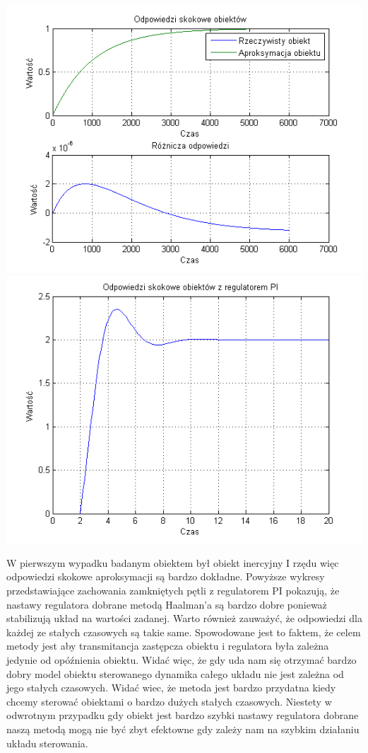 \documentclass[10pt,a4paper]{article}
\begin{document}
\begin{center}
\includegraphics[scale=1]{images/jeden/skrypt_41.png}\\
\includegraphics[scale=1]{images/jeden/skrypt_42.png}\\
\end{center}
\newpage

W pierwszym wypadku badanym obiektem był obiekt inercyjny I rzędu więc odpowiedzi skokowe aproksymacji są bardzo dokładne. Powyższe wykresy przedstawiające zachowania zamkniętych pętli z regulatorem PI pokazują, że nastawy regulatora dobrane metodą Haalman’a są bardzo dobre ponieważ stabilizują układ na wartości zadanej. Warto również zauważyć, że odpowiedzi dla każdej ze stałych czasowych są takie same. Spowodowane jest to faktem, że celem metody jest aby transmitancja zastępcza obiektu i regulatora była zależna jedynie od opóźnienia obiektu. Widać więc, że gdy uda nam się otrzymać bardzo dobry model obiektu sterowanego dynamika całego układu nie jest zależna od jego stałych czasowych. Widać wiec, że metoda jest bardzo przydatna kiedy chcemy sterować obiektami o bardzo dużych stałych czasowych. Niestety w odwrotnym przypadku gdy obiekt jest bardzo szybki nastawy regulatora dobrane naszą metodą mogą nie być zbyt efektowne gdy zależy nam na szybkim działaniu układu sterowania. 
\newpage
\end{document}
